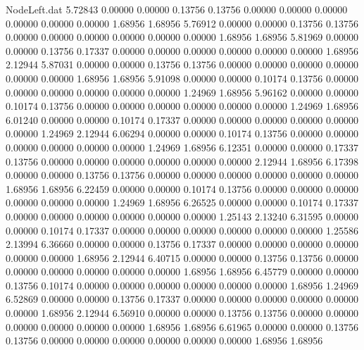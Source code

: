 \begin{filecontents}{NodeLeft.dat}
   5.72843    0.00000    0.00000     0.13756    0.13756    0.00000    0.00000    0.00000    0.00000    0.00000    0.00000    1.68956    1.68956
   5.76912    0.00000    0.00000     0.13756    0.13756    0.00000    0.00000    0.00000    0.00000    0.00000    0.00000    1.68956    1.68956
   5.81969    0.00000    0.00000     0.13756    0.17337    0.00000    0.00000    0.00000    0.00000    0.00000    0.00000    1.68956    2.12944
   5.87031    0.00000    0.00000     0.13756    0.13756    0.00000    0.00000    0.00000    0.00000    0.00000    0.00000    1.68956    1.68956
   5.91098    0.00000    0.00000     0.10174    0.13756    0.00000    0.00000    0.00000    0.00000    0.00000    0.00000    1.24969    1.68956
   5.96162    0.00000    0.00000     0.10174    0.13756    0.00000    0.00000    0.00000    0.00000    0.00000    0.00000    1.24969    1.68956
   6.01240    0.00000    0.00000     0.10174    0.17337    0.00000    0.00000    0.00000    0.00000    0.00000    0.00000    1.24969    2.12944
   6.06294    0.00000    0.00000     0.10174    0.13756    0.00000    0.00000    0.00000    0.00000    0.00000    0.00000    1.24969    1.68956
   6.12351    0.00000    0.00000     0.17337    0.13756    0.00000    0.00000    0.00000    0.00000    0.00000    0.00000    2.12944    1.68956
   6.17398    0.00000    0.00000     0.13756    0.13756    0.00000    0.00000    0.00000    0.00000    0.00000    0.00000    1.68956    1.68956
   6.22459    0.00000    0.00000     0.10174    0.13756    0.00000    0.00000    0.00000    0.00000    0.00000    0.00000    1.24969    1.68956
   6.26525    0.00000    0.00000     0.10174    0.17337    0.00000    0.00000    0.00000    0.00000    0.00000    0.00000    1.25143    2.13240
   6.31595    0.00000    0.00000     0.10174    0.17337    0.00000    0.00000    0.00000    0.00000    0.00000    0.00000    1.25586    2.13994
   6.36660    0.00000    0.00000     0.13756    0.17337    0.00000    0.00000    0.00000    0.00000    0.00000    0.00000    1.68956    2.12944
   6.40715    0.00000    0.00000     0.13756    0.13756    0.00000    0.00000    0.00000    0.00000    0.00000    0.00000    1.68956    1.68956
   6.45779    0.00000    0.00000     0.13756    0.10174    0.00000    0.00000    0.00000    0.00000    0.00000    0.00000    1.68956    1.24969
   6.52869    0.00000    0.00000     0.13756    0.17337    0.00000    0.00000    0.00000    0.00000    0.00000    0.00000    1.68956    2.12944
   6.56910    0.00000    0.00000     0.13756    0.13756    0.00000    0.00000    0.00000    0.00000    0.00000    0.00000    1.68956    1.68956
   6.61965    0.00000    0.00000     0.13756    0.13756    0.00000    0.00000    0.00000    0.00000    0.00000    0.00000    1.68956    1.68956

\end{filecontents}
